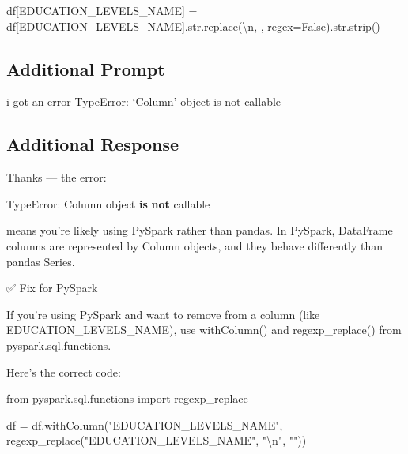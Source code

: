 \documentclass[
  letterpaper,
  DIV=11,
  numbers=noendperiod]{scrartcl}
\newenvironment{Shaded}{\begin{snugshade}}{\end{snugshade}}
\newcommand{\BuiltInTok}[1]{\textcolor[rgb]{0.00,0.23,0.31}{#1}}
\newcommand{\CharTok}[1]{\textcolor[rgb]{0.13,0.47,0.30}{#1}}
\newcommand{\ImportTok}[1]{\textcolor[rgb]{0.00,0.46,0.62}{#1}}
\newcommand{\KeywordTok}[1]{\textcolor[rgb]{0.00,0.23,0.31}{\textbf{#1}}}
\newcommand{\NormalTok}[1]{\textcolor[rgb]{0.00,0.23,0.31}{#1}}
\newcommand{\OperatorTok}[1]{\textcolor[rgb]{0.37,0.37,0.37}{#1}}
\newcommand{\PreprocessorTok}[1]{\textcolor[rgb]{0.68,0.00,0.00}{#1}}
\newcommand{\StringTok}[1]{\textcolor[rgb]{0.13,0.47,0.30}{#1}}
\newcommand{\VariableTok}[1]{\textcolor[rgb]{0.07,0.07,0.07}{#1}}
\begin{document}
\begin{Shaded}
\begin{Highlighting}[]
\NormalTok{df[}\StringTok{\textquotesingle{}EDUCATION\_LEVELS\_NAME\textquotesingle{}}\NormalTok{] }\OperatorTok{=}\NormalTok{ df[}\StringTok{\textquotesingle{}EDUCATION\_LEVELS\_NAME\textquotesingle{}}\NormalTok{].}\BuiltInTok{str}\NormalTok{.replace(}\StringTok{\textquotesingle{}}\CharTok{\textbackslash{}n}\StringTok{\textquotesingle{}}\NormalTok{, }\StringTok{\textquotesingle{}\textquotesingle{}}\NormalTok{, regex}\OperatorTok{=}\VariableTok{False}\NormalTok{).}\BuiltInTok{str}\NormalTok{.strip()}
\end{Highlighting}
\end{Shaded}

\subsection{Additional Prompt}\label{additional-prompt}

i got an error TypeError: `Column' object is not callable

\subsection{Additional Response}\label{additional-response}

Thanks --- the error:

\begin{Shaded}
\begin{Highlighting}[]
\PreprocessorTok{TypeError}\NormalTok{: }\StringTok{\textquotesingle{}Column\textquotesingle{}} \BuiltInTok{object} \KeywordTok{is} \KeywordTok{not} \BuiltInTok{callable}
\end{Highlighting}
\end{Shaded}

means you're likely using PySpark rather than pandas. In PySpark,
DataFrame columns are represented by Column objects, and they behave
differently than pandas Series.

✅ Fix for PySpark

If you're using PySpark and want to remove \n from a column (like
EDUCATION\_LEVELS\_NAME), use withColumn() and regexp\_replace() from
pyspark.sql.functions.

Here's the correct code:

\begin{Shaded}
\begin{Highlighting}[]
\ImportTok{from}\NormalTok{ pyspark.sql.functions }\ImportTok{import}\NormalTok{ regexp\_replace}

\NormalTok{df }\OperatorTok{=}\NormalTok{ df.withColumn(}\StringTok{"EDUCATION\_LEVELS\_NAME"}\NormalTok{, regexp\_replace(}\StringTok{"EDUCATION\_LEVELS\_NAME"}\NormalTok{, }\StringTok{"}\CharTok{\textbackslash{}n}\StringTok{"}\NormalTok{, }\StringTok{""}\NormalTok{))}
\end{Highlighting}
\end{Shaded}
\end{document}
